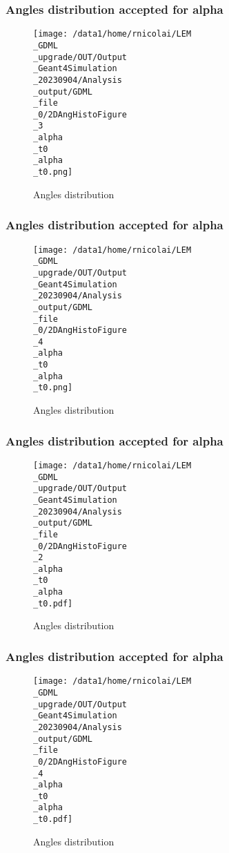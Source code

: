 \documentclass[8pt]{beamer}
\begin{document}
            \begin{frame}
                \frametitle{Angles distribution accepted for alpha}
            
        \begin{figure}[h]
            \centering
            \texttt{[image: /data1/home/rnicolai/LEM\\\_GDML\\\_upgrade/OUT/Output\\\_Geant4Simulation\\\_20230904/Analysis\\\_output/GDML\\\_file\\\_0/2DAngHistoFigure\\\_3\\\_alpha\\\_t0\\\_alpha\\\_t0.png]}
            \caption{Angles distribution}
        \end{figure}
        
            \end{frame}
            
            \begin{frame}
                \frametitle{Angles distribution accepted for alpha}
            
        \begin{figure}[h]
            \centering
            \texttt{[image: /data1/home/rnicolai/LEM\\\_GDML\\\_upgrade/OUT/Output\\\_Geant4Simulation\\\_20230904/Analysis\\\_output/GDML\\\_file\\\_0/2DAngHistoFigure\\\_4\\\_alpha\\\_t0\\\_alpha\\\_t0.png]}
            \caption{Angles distribution}
        \end{figure}
        
            \end{frame}
            
            \begin{frame}
                \frametitle{Angles distribution accepted for alpha}
            
        \begin{figure}[h]
            \centering
            \texttt{[image: /data1/home/rnicolai/LEM\\\_GDML\\\_upgrade/OUT/Output\\\_Geant4Simulation\\\_20230904/Analysis\\\_output/GDML\\\_file\\\_0/2DAngHistoFigure\\\_2\\\_alpha\\\_t0\\\_alpha\\\_t0.pdf]}
            \caption{Angles distribution}
        \end{figure}
        
            \end{frame}
            
            \begin{frame}
                \frametitle{Angles distribution accepted for alpha}
            
        \begin{figure}[h]
            \centering
            \texttt{[image: /data1/home/rnicolai/LEM\\\_GDML\\\_upgrade/OUT/Output\\\_Geant4Simulation\\\_20230904/Analysis\\\_output/GDML\\\_file\\\_0/2DAngHistoFigure\\\_4\\\_alpha\\\_t0\\\_alpha\\\_t0.pdf]}
            \caption{Angles distribution}
        \end{figure}
        
            \end{frame}
            
\end{document}
